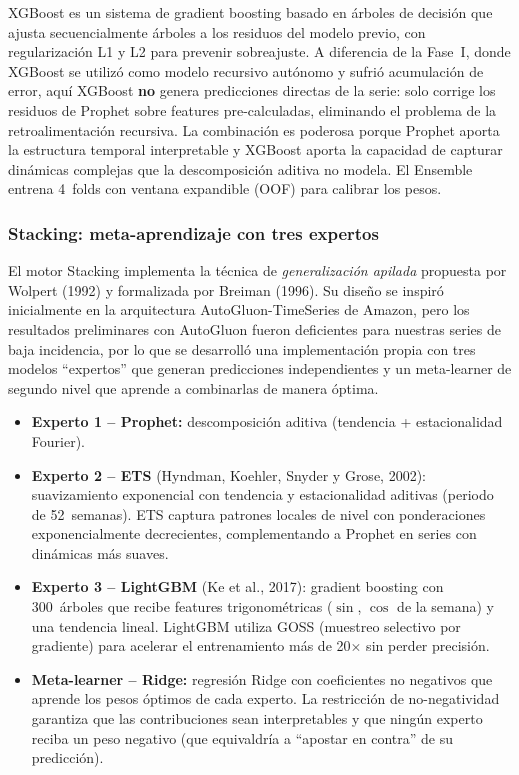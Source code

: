 \documentclass[12pt, letterpaper]{article}
\begin{document}
XGBoost es un sistema de gradient boosting basado en árboles de decisión que ajusta secuencialmente árboles a los residuos del modelo previo, con regularización L1 y L2 para prevenir sobreajuste. A diferencia de la Fase~I, donde XGBoost se utilizó como modelo recursivo autónomo y sufrió acumulación de error, aquí XGBoost \textbf{no} genera predicciones directas de la serie: solo corrige los residuos de Prophet sobre features pre-calculadas, eliminando el problema de la retroalimentación recursiva. La combinación es poderosa porque Prophet aporta la estructura temporal interpretable y XGBoost aporta la capacidad de capturar dinámicas complejas que la descomposición aditiva no modela. El Ensemble entrena 4~folds con ventana expandible (OOF) para calibrar los pesos.

\subsubsection{Stacking: meta-aprendizaje con tres expertos}

El motor Stacking implementa la técnica de \textit{generalización apilada} propuesta por Wolpert (1992) y formalizada por Breiman (1996). Su diseño se inspiró inicialmente en la arquitectura AutoGluon-TimeSeries de Amazon, pero los resultados preliminares con AutoGluon fueron deficientes para nuestras series de baja incidencia, por lo que se desarrolló una implementación propia con tres modelos ``expertos'' que generan predicciones independientes y un meta-learner de segundo nivel que aprende a combinarlas de manera óptima.

\begin{itemize}
  \item \textbf{Experto 1 -- Prophet:} descomposición aditiva (tendencia + estacionalidad Fourier).
  \item \textbf{Experto 2 -- ETS} (Hyndman, Koehler, Snyder y Grose, 2002): suavizamiento exponencial con tendencia y estacionalidad aditivas (periodo de 52~semanas). ETS captura patrones locales de nivel con ponderaciones exponencialmente decrecientes, complementando a Prophet en series con dinámicas más suaves.
  \item \textbf{Experto 3 -- LightGBM} (Ke et al., 2017): gradient boosting con 300~árboles que recibe features trigonométricas ($\sin$, $\cos$ de la semana) y una tendencia lineal. LightGBM utiliza GOSS (muestreo selectivo por gradiente) para acelerar el entrenamiento más de 20$\times$ sin perder precisión.
  \item \textbf{Meta-learner -- Ridge:} regresión Ridge con coeficientes no negativos que aprende los pesos óptimos de cada experto. La restricción de no-negatividad garantiza que las contribuciones sean interpretables y que ningún experto reciba un peso negativo (que equivaldría a ``apostar en contra'' de su predicción).
\end{itemize}
\end{document}
